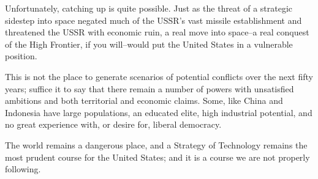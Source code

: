 Unfortunately, catching up is quite possible. Just as the threat of a strategic sidestep into space negated much of the USSR's vast missile establishment and threatened the USSR with economic ruin, a real move into space--a real conquest of the High Frontier, if you will--would put the United States in a vulnerable position.

This is not the place to generate scenarios of potential conflicts over the next fifty years; suffice it to say that there remain a number of powers with unsatisfied ambitions and both territorial and economic claims. Some, like China and Indonesia have large populations, an educated elite, high industrial potential, and no great experience with, or desire for, liberal democracy.

The world remains a dangerous place, and a Strategy of Technology remains the most prudent course for the United States; and it is a course we are not properly following.
